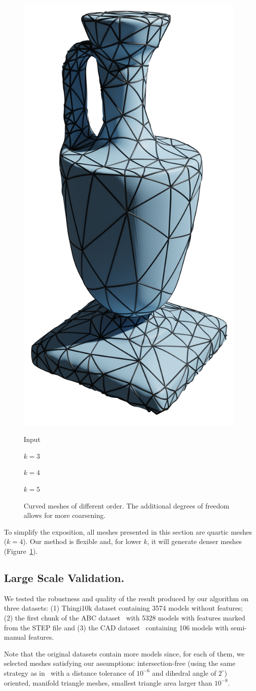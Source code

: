 \begin{figure}
    \includegraphics[width=.23\linewidth]{curve_meshing_in_shell_tex/figs/anphora/0003}
     \parbox{.24\linewidth}{\centering Input}\hfill
    \parbox{.24\linewidth}{\centering $k=3$}\hfill
    \parbox{.24\linewidth}{\centering $k=4$}\hfill
    \parbox{.24\linewidth}{\centering $k=5$}
    \caption{Curved meshes of different order. The additional degrees of freedom allows for more coarsening.}
    \label{bichon:fig:diff-k}
\end{figure}

To simplify the exposition, all meshes presented in this section are quartic meshes ($k=4$). Our method is flexible and, for lower $k$, it will generate denser meshes (Figure~\ref{bichon:fig:diff-k}).

\subsection{Large Scale Validation.}

We tested the robustness and quality of the result produced by our algorithm on three datasets: (1) Thingi10k dataset \cite{zhou2016thingi10k} containing 3574 models without features; (2) the first chunk {of} the ABC dataset~\cite{Koch_2019_CVPR} with 5328 models with features marked from the STEP file and (3) the CAD dataset~\cite{Gao:2019} containing 106 models with semi-manual features.

Note that the original datasets contain more models since, for each of them, we selected meshes satisfying our assumptions: intersection-free (using the same strategy as in~\cite{jiang2020bijective} with a distance tolerance of $10^{-6}$ and dihedral angle of $2^\circ$) oriented, manifold triangle meshes, smallest triangle area larger than $10^{-8}$. 





